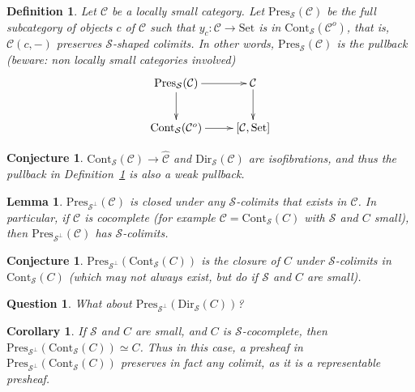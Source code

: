 \documentclass{article}
\newcommand{\Cont}[1]{\text{Cont}_{#1}}
\newcommand{\Dir}[1]{\text{Dir}_{#1}}
\newcommand{\Pres}[1]{\text{Pres}_{#1}}
\newcommand{\Set}{\text{Set}}
\newtheorem{definition}[theorem]{Definition}
\newtheorem{conjecture}[theorem]{Conjecture}
\newtheorem{corollary}[theorem]{Corollary}
\newtheorem{question}[theorem]{Question}
\newtheorem{lemma}[theorem]{Lemma}
\begin{document}
  \begin{definition}
    \label{d:presentable-objs}
    Let $\mathcal{C}$ be a locally small category.
    Let $\Pres{\mathcal{S}}(\mathcal{C})$ be the full subcategory of objects $c$ of $\mathcal{C}$ such that 
    $y_c : \mathcal{C} \rightarrow \Set$ is in $\Cont{\mathcal{S}}(\mathcal{C}^o)$, that is,
    $\mathcal{C}(c,-)$ preserves $\mathcal{S}$-shaped colimits.
    In other words, $\Pres{\mathcal{S}}(\mathcal{C})$ is the pullback (beware:
    non locally small categories involved)
    \[
      \xymatrix{
        \Pres{\mathcal{S}}(\mathcal{C}) \ar[r]\ar[d]&
        \mathcal{C}
        \ar[d]
        \\
        \Cont{\mathcal{S}}(\mathcal{C}^o) \ar[r]
        &
        [\mathcal{C}, \Set]
      }
    \]
  \end{definition}
  \begin{conjecture}
    $\Cont{\mathcal{S}}(\mathcal{C}) \rightarrow \hat{\mathcal{C}}$  and $\Dir{\mathcal{S}}(\mathcal{C})$ are
    isofibrations, and thus the pullback
    in Definition~\ref{d:presentable-objs} is also a weak pullback.
  \end{conjecture}
  \begin{lemma}
    \( \Pres{\mathcal{S}^\bot}(\mathcal{C}) \)
    is closed under any $\mathcal{S}$-colimits
    that exists in $\mathcal{C}$. In particular, if
    $\mathcal{C}$ is cocomplete (for example $\mathcal{C} =
    \Cont{\mathcal{S}}(C)$ with $\mathcal{S}$ and $C$ small),
    then $\Pres{\mathcal{S}^\bot}(\mathcal{C})$ has
    $\mathcal{S}$-colimits.
  \end{lemma}
  \begin{conjecture}
    $\Pres{\mathcal{S}^\bot}(\Cont{\mathcal{S}}(C))$ is the 
    closure of $C$ under $\mathcal{S}$-colimits in $\Cont{\mathcal{S}}(C)$
    (which may not always exist, but do if $\mathcal{S}$ and $C$ are small).
  \end{conjecture}
  \begin{question}
   What about $\Pres{\mathcal{S}^\bot}(\Dir{\mathcal{S}}(C))$?
  \end{question}
  \begin{corollary}
    If $\mathcal{S}$  and $C$ are small, and $C$ is $\mathcal{S}$-cocomplete, then
    $\Pres{\mathcal{S}^\bot}(\Cont{\mathcal{S}}(C))\simeq C$.
    Thus in this case, a presheaf in $\Pres{\mathcal{S}^\bot}(\Cont{\mathcal{S}}(C))$ preserves
    in fact any colimit, as it is a representable presheaf.
  \end{corollary}
\end{document}
